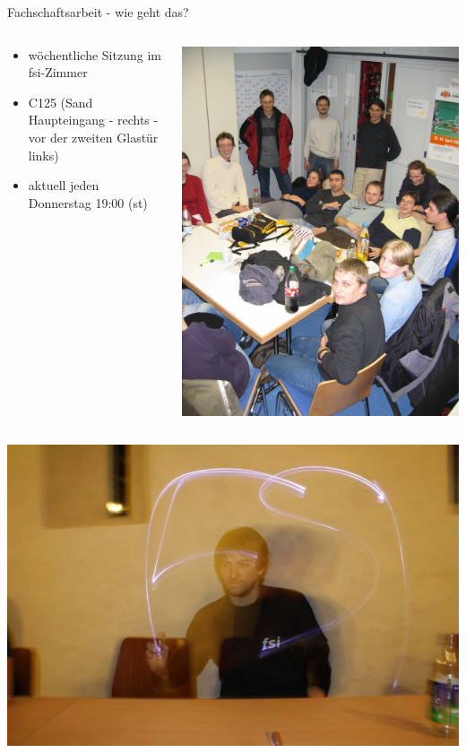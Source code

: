 \documentclass{beamer}
\begin{document}
	\begin{frame}{Fachschaftsarbeit - wie geht das?}
		\begin{columns}
			\begin{column}{.5\linewidth}
				\begin{itemize}
					\item wöchentliche Sitzung im fsi-Zimmer
					\item C125 (Sand Haupteingang - rechts - vor der zweiten Glastür links)
					\item aktuell jeden Donnerstag 19:00 (st)
				\end{itemize}
			\end{column}
			\begin{column}{0.5\linewidth}
				\includegraphics[width=\linewidth]{Sitzung.jpg}
			\end{column}
		\end{columns}
	\end{frame}

	\begin{frame}
		\includegraphics[width=\linewidth]{fsi-manu.png}
	\end{frame}
		
	
\end{document}
